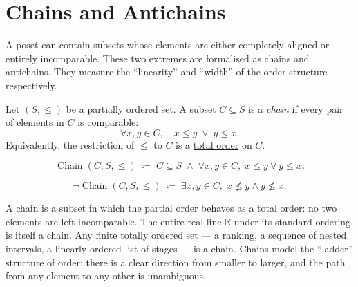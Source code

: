 
\section{Chains and Antichains}
\label{sec:chains-antichains}

\begin{tcolorbox}[
  colback=gray!6,
  colframe=gray!40,
  arc=2pt,
  left=8pt, right=8pt, top=6pt, bottom=6pt,
  title={\small\textbf{Toolkit: Chains and Antichains}},
  fonttitle=\small\bfseries
]
A poset can contain subsets whose elements are either completely aligned
or entirely incomparable.  These two extremes are formalised as chains and
antichains.  They measure the ``linearity'' and ``width'' of the order
structure respectively.
\end{tcolorbox}


\begin{tcolorbox}[colback=defbox, colframe=defborder, arc=2pt,
  left=6pt, right=6pt, top=4pt, bottom=4pt,
  title={\small\textbf{Definition (Chain)}},
  fonttitle=\small\bfseries]
\begin{definition}[Chain]
\label{def:chain}
Let $(S, \leq)$ be a partially ordered set.  A subset $C \subseteq S$ is a
\emph{chain} if every pair of elements in $C$ is comparable:
\[
\forall x, y \in C, \quad x \leq y \;\lor\; y \leq x.
\]
Equivalently, the restriction of $\leq$ to $C$ is a
\hyperref[def:total-order]{total order} on $C$.
\end{definition}
\end{tcolorbox}

\begin{remark*}
\[
\operatorname{Chain}(C, S, \leq)
\;\coloneqq\;
C \subseteq S
\;\land\;
\forall x, y \in C,\; x \leq y \lor y \leq x.
\]
\end{remark*}

\begin{remark*}
\[
\neg\operatorname{Chain}(C, S, \leq)
\;\coloneqq\;
\exists x, y \in C,\; x \not\leq y \land y \not\leq x.
\]
\end{remark*}

\begin{remark*}[Interpretation]
A chain is a subset in which the partial order behaves as a total order:
no two elements are left incomparable.  The entire real line $\mathbb{R}$
under its standard ordering is itself a chain.  Any finite totally ordered
set — a ranking, a sequence of nested intervals, a linearly ordered list
of stages — is a chain.  Chains model the ``ladder'' structure of order:
there is a clear direction from smaller to larger, and the path from any
element to any other is unambiguous.
\end{remark*}

